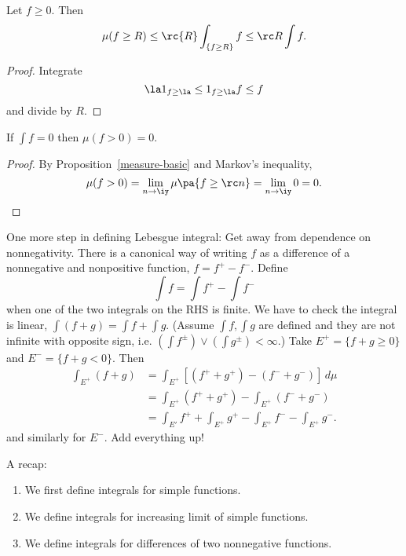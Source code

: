 \begin{thm}
Let $f\geq 0$. Then
\[
\mu(f\geq R)\leq \rc{R}\int_{\{f\geq R\}} f\leq \rc R \int{f}.
\]
\end{thm}
\begin{proof}
Integrate 
\[
\la 1_{f\geq \la}\leq 1_{f\geq \la}f\leq f
\]
and divide by $R$.
\end{proof}
\begin{cor}
If $\int f=0$ then $\mu(f>0)=0$.
\end{cor}
\begin{proof}
By Proposition~\ref{measure-basic} and Markov's inequality,
\[
\mu(f>0)=\lim_{n\to \iy} \mu\pa{f\geq \rc n}=\lim_{n\to \iy} 0=0.
\]
\end{proof}
One more step in defining Lebesgue integral: 
Get away from dependence on nonnegativity. There is a canonical way of writing $f$ as a difference of a nonnegative and nonpositive function, $f=f^+-f^-$. Define
\[
\int f=\int f^+-\int f^-
\]
when one of the two integrals on the RHS is finite. We have to check the integral is linear, $\int (f+g)=\int f+\int g$. (Assume $\int f, \int g$ are defined and they are not infinite with opposite sign, i.e. $(\int f^{\pm})\vee (\int g^{\pm})<\infty$.)
Take $E^+=\{f+g\geq 0\}$ and $E^-=\{f+g<0\}$.
Then
\begin{align*}
\int_{E^+} (f+g)&=\int_{E^+} [(f^++g^+)-(f^-+g^-)]\,d\mu\\
&=\int_{E^+} (f^++g^+)-\int_{E^+} (f^-+g^-)\\
&=\int_{E'} f^++\int_{E^+}g^+-\int_{E^+}f^--\int_{E^+} g^-.
\end{align*}
and similarly for $E^-$. Add everything up!

A recap:
\begin{enumerate}
\item
We first define integrals for simple functions.
\item
We define integrals for increasing limit of simple functions.
\item
We define integrals for differences of two nonnegative functions.
\end{enumerate}
